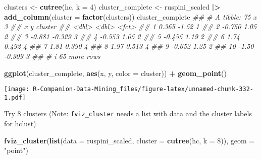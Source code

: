 \documentclass[
  notitlepage]{book}
\newenvironment{Shaded}{\begin{snugshade}}{\end{snugshade}}
\newcommand{\CommentTok}[1]{\textcolor[rgb]{0.56,0.35,0.01}{\textit{#1}}}
\newcommand{\DataTypeTok}[1]{\textcolor[rgb]{0.13,0.29,0.53}{#1}}
\newcommand{\DecValTok}[1]{\textcolor[rgb]{0.00,0.00,0.81}{#1}}
\newcommand{\ErrorTok}[1]{\textcolor[rgb]{0.64,0.00,0.00}{\textbf{#1}}}
\newcommand{\KeywordTok}[1]{\textcolor[rgb]{0.13,0.29,0.53}{\textbf{#1}}}
\newcommand{\NormalTok}[1]{#1}
\newcommand{\OperatorTok}[1]{\textcolor[rgb]{0.81,0.36,0.00}{\textbf{#1}}}
\newcommand{\StringTok}[1]{\textcolor[rgb]{0.31,0.60,0.02}{#1}}
\begin{document}
\begin{Shaded}
\begin{Highlighting}[]
\NormalTok{clusters \textless{}{-}}\StringTok{ }\KeywordTok{cutree}\NormalTok{(hc, }\DataTypeTok{k =} \DecValTok{4}\NormalTok{)}
\NormalTok{cluster\_complete \textless{}{-}}\StringTok{ }\NormalTok{ruspini\_scaled }\OperatorTok{|}\ErrorTok{\textgreater{}}
\StringTok{  }\KeywordTok{add\_column}\NormalTok{(}\DataTypeTok{cluster =} \KeywordTok{factor}\NormalTok{(clusters))}
\NormalTok{cluster\_complete}
\CommentTok{\#\# \# A tibble: 75 x 3}
\CommentTok{\#\#         x      y cluster}
\CommentTok{\#\#     \textless{}dbl\textgreater{}  \textless{}dbl\textgreater{} \textless{}fct\textgreater{}  }
\CommentTok{\#\#  1  0.365 {-}1.52  1      }
\CommentTok{\#\#  2 {-}0.750  1.05  2      }
\CommentTok{\#\#  3 {-}0.881 {-}0.329 3      }
\CommentTok{\#\#  4 {-}0.553  1.05  2      }
\CommentTok{\#\#  5 {-}0.455  1.19  2      }
\CommentTok{\#\#  6  1.74   0.492 4      }
\CommentTok{\#\#  7  1.81   0.390 4      }
\CommentTok{\#\#  8  1.97   0.513 4      }
\CommentTok{\#\#  9 {-}0.652  1.25  2      }
\CommentTok{\#\# 10 {-}1.50  {-}0.309 3      }
\CommentTok{\#\# \# i 65 more rows}
\end{Highlighting}
\end{Shaded}

\begin{Shaded}
\begin{Highlighting}[]
\KeywordTok{ggplot}\NormalTok{(cluster\_complete, }\KeywordTok{aes}\NormalTok{(x, y, }\DataTypeTok{color =}\NormalTok{ cluster)) }\OperatorTok{+}
\StringTok{  }\KeywordTok{geom\_point}\NormalTok{()}
\end{Highlighting}
\end{Shaded}

\texttt{[image: R-Companion-Data-Mining\_files/figure-latex/unnamed-chunk-332-1.pdf]}

Try 8 clusters (Note: \texttt{fviz\_cluster} needs a list with data and the
cluster labels for hclust)

\begin{Shaded}
\begin{Highlighting}[]
\KeywordTok{fviz\_cluster}\NormalTok{(}\KeywordTok{list}\NormalTok{(}\DataTypeTok{data =}\NormalTok{ ruspini\_scaled, }
                  \DataTypeTok{cluster =} \KeywordTok{cutree}\NormalTok{(hc, }\DataTypeTok{k =} \DecValTok{8}\NormalTok{)), }
             \DataTypeTok{geom =} \StringTok{"point"}\NormalTok{)}
\end{Highlighting}
\end{Shaded}
\end{document}
